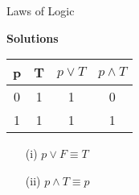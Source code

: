 \documentclass{beamer}
\begin{document}
\begin{frame}
{Laws of Logic}

\textbf{Solutions}
\begin{center}

\begin{tabular}{|c|c||c||c|}
\hline  \phantom{sp}p\phantom{sp}&  \phantom{sp}T\phantom{sp}& $p \vee T$ & $ p \wedge T$ \\ \hline
\hline  0 & 1 & 1 & 0 \\ 
\hline  1 &  1 & 1 & 1 \\ 
\hline 
\end{tabular} 
\end{center}
\begin{itemize}
\item[(i)] $p \vee F \equiv T$
\item[(ii)] $p \wedge T \equiv p$
\end{itemize}
\end{frame}
\end{document}
